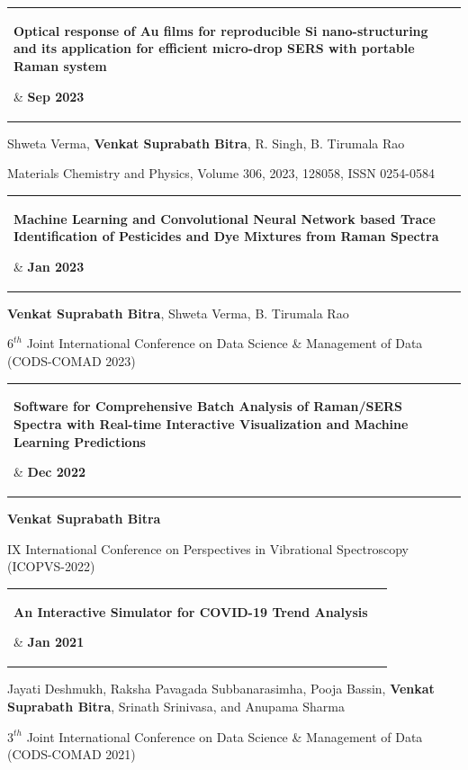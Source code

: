\documentclass[letterpaper,11pt]{article}
\makeatletter
\newcommand{\resumeItem}[1]{
  \item\small{
    {#1 \vspace{-2pt}}
  }
}
\newcommand{\publicationHeading}[2]{
    \item
    \begin{tabular*}{1.001\textwidth}{@{\extracolsep{\fill}} l r}
      \parbox[t]{0.9\textwidth}{\small#1} & \textbf{\small #2}\\
    \end{tabular*}\vspace{-7pt}
}
\makeatother
\begin{document}
\vspace{-12pt}

\publicationHeading{\textbf{Optical response of Au films for reproducible Si nano-structuring and its application for efficient micro-drop SERS with portable Raman system}}{Sep 2023}
\vspace{-4pt}
\resumeItem{Shweta Verma, \textbf{Venkat Suprabath Bitra}, R. Singh, B. Tirumala Rao}
\vspace{-4pt}  
\resumeItem{ Materials Chemistry and Physics, Volume 306, 2023, 128058, ISSN 0254-0584 \href{https://doi.org/10.1016/j.matchemphys.2023.128058}{\raisebox{-0.2\height}\faExternalLink}}

\vspace{-12pt}


\publicationHeading{\textbf{Machine Learning and Convolutional Neural Network based Trace Identification of Pesticides and Dye Mixtures from Raman Spectra}}{Jan 2023}
\vspace{-4pt}
\resumeItem{\textbf{Venkat Suprabath Bitra}, Shweta Verma, B. Tirumala Rao}
\vspace{-4pt}  
\resumeItem{ $6^{th}$ Joint International Conference on Data Science \& Management of Data (CODS-COMAD 2023) \href{https://doi.org/10.1145/3570991.3571007}{\raisebox{-0.2\height}\faExternalLink}}


\vspace{-12pt}

%

\publicationHeading{\textbf{Software for Comprehensive Batch Analysis of Raman/SERS Spectra with Real-time Interactive Visualization  and Machine Learning Predictions}}{Dec 2022}
\vspace{-4pt}
\resumeItem{\textbf{Venkat Suprabath Bitra}}
\vspace{-4pt}  
\resumeItem{ IX International Conference on Perspectives in Vibrational Spectroscopy (ICOPVS-2022) \href{https://drive.google.com/file/d/12ldAYec7JVinx3Xrtw3SRgc_I1RNyR9D/view?usp=sharing}{\raisebox{-0.2\height}\faExternalLink}}


\vspace{-12pt}

%

\publicationHeading{\textbf{An Interactive Simulator for COVID-19 Trend Analysis}}{Jan 2021}
\vspace{-12pt}
\resumeItem{Jayati Deshmukh, Raksha Pavagada Subbanarasimha, Pooja Bassin, \textbf{Venkat Suprabath Bitra}, Srinath Srinivasa, and Anupama Sharma}
\vspace{-4pt}  
\resumeItem{$3^{th}$ Joint International Conference on Data Science \& Management of Data (CODS-COMAD 2021) \href{https://dl.acm.org/doi/10.1145/3430984.3430989}{\raisebox{-0.2\height}\faExternalLink}}
\end{document}
